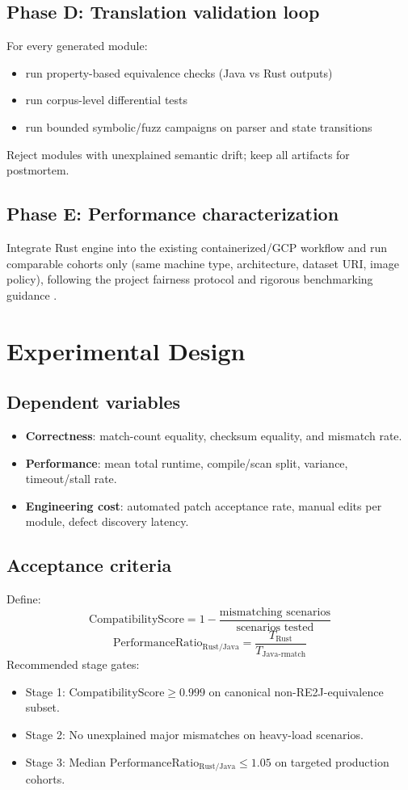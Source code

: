 \documentclass[11pt]{article}
\begin{document}
\subsection{Phase D: Translation validation loop}
For every generated module:
\begin{itemize}
  \item run property-based equivalence checks (Java vs Rust outputs) \cite{claessen2000quickcheck}
  \item run corpus-level differential tests
  \item run bounded symbolic/fuzz campaigns on parser and state transitions \cite{cadar2008klee}
\end{itemize}
Reject modules with unexplained semantic drift; keep all artifacts for postmortem.

\subsection{Phase E: Performance characterization}
Integrate Rust engine into the existing containerized/GCP workflow and run comparable cohorts only (same machine type, architecture, dataset URI, image policy), following the project fairness protocol and rigorous benchmarking guidance \cite{georges2007,kalibera2013}.

\section{Experimental Design}
\subsection{Dependent variables}
\begin{itemize}
  \item \textbf{Correctness}: match-count equality, checksum equality, and mismatch rate.
  \item \textbf{Performance}: mean total runtime, compile/scan split, variance, timeout/stall rate.
  \item \textbf{Engineering cost}: automated patch acceptance rate, manual edits per module, defect discovery latency.
\end{itemize}

\subsection{Acceptance criteria}
Define:
\[
\text{CompatibilityScore} = 1 - \frac{\text{mismatching scenarios}}{\text{scenarios tested}}
\]
\[
\text{PerformanceRatio}_{\text{Rust/Java}} = \frac{T_{\text{Rust}}}{T_{\text{Java-rmatch}}}
\]
Recommended stage gates:
\begin{itemize}
  \item Stage 1: \(\text{CompatibilityScore} \ge 0.999\) on canonical non-RE2J-equivalence subset.
  \item Stage 2: No unexplained major mismatches on heavy-load scenarios.
  \item Stage 3: Median \(\text{PerformanceRatio}_{\text{Rust/Java}} \le 1.05\) on targeted production cohorts.
\end{itemize}
\end{document}
